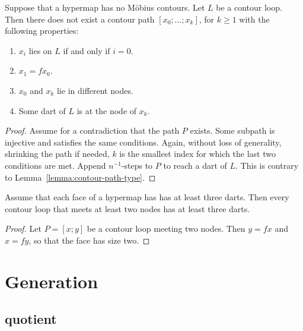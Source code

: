 \begin{lemma}
Suppose that a hypermap has no M\"obius contours.  Let $L$ be a
contour loop.  Then there does not exist a contour path
$[x_0;\ldots;x_k]$, for $k\ge 1$ with the following properties:
\begin{enumerate}
\item $x_i$ lies on $L$ if and only if $i=0$.
\item $x_1 = f x_0$.
\item $x_0$ and $x_k$ lie in different nodes.
\item Some dart of $L$ is at the node of $x_k$.
\end{enumerate}
\end{lemma}


\begin{proof} Assume for a contradiction that the path $P$ exists.
Some subpath is injective and satisfies the same conditions.  Again,
without loss of generality, shrinking the path if needed, $k$ is the
smallest index for which the last two conditions are met.  Append
$n^{-1}$-steps to $P$ to reach a dart of $L$.  This is contrary to
Lemma~\ref{lemma:contour-path-type}.
\end{proof}

\begin{lemma}\label{lemma:3dart}  
Assume that each face of a hypermap has has at least three darts.
Then every contour loop that meets at least two nodes has at least
three darts.
\end{lemma}

\begin{proof} Let $P=[x;y]$ be a contour loop meeting two nodes.  Then
$y = f x$ and $x = f y$, so that the face has size two.
\end{proof}

\section{Generation}
%

\subsection{quotient}
%

